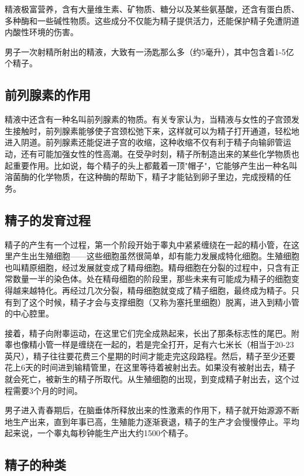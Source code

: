 精液极富营养，含有大量维生素、矿物质、糖分以及某些氨基酸，还含有蛋白质、多种酶和一些碱性物质。这些成分不仅能为精子提供活力，还能保护精子免遭阴道内酸性环境的伤害。

男子一次射精所射出的精液，大致有一汤匙那么多（约5毫升），其中包含着1-5亿个精子。

\subsection{前列腺素的作用}

精液中还含有一种名叫前列腺素的物质。有关专家认为，当精液与女性的子宫颈发生接触时，前列腺素能够使子宫颈松弛下来，这样就可以为精子打开通道，轻松地进入阴道。前列腺素还能促进子宫的收缩，这种收缩不仅有利于精子向输卵管运动，还有可能加强女性的性高潮。在受孕时刻，精子所制造出来的某些化学物质也起重要作用。比如说，每个精子的头上都戴着一顶"帽子"，它能够产生出一种名叫溶菌酶的化学物质，在这种酶的帮助下，精子才能钻到卵子里边，完成授精的任务。

\subsection{精子的发育过程}

精子的产生有一个过程，第一个阶段开始于睾丸中紧紧缠绕在一起的精小管，在这里产生出生殖细胞——这些细胞虽然很简单，却有能力发展成特化细胞。生殖细胞也叫精原细胞，经过发展就变成了精母细胞。精母细胞在分裂的过程中，只含有正常数量一半的染色体。处在精母细胞的阶段里，那些未来有可能成为精子的细胞变得越来越特化。再经过几次分裂，精母细胞就变成了精子细胞，最终成为精子。只有到了这个时候，精子才会与支撑细胞（又称为塞托里细胞）脱离，进入到精小管的中心腔里。

接着，精子向附睾运动，在这里它们完全成熟起来，长出了那条标志性的尾巴。附睾也像精小管一样是缠绕在一起的，若是完全打开，足有六七米长（相当于20-23英尺），精子往往要花费三个星期的时间才能走完这段路程。然后，精子至少还要花上6天的时间进到输精管里，在这里等待着被射出去。如果没有被射出去，精子就会死亡，被新生的精子所取代。从生殖细胞的出现，到变成精子射出去，这个过程需要3个月的时间。

男子进入青春期后，在脑垂体所释放出来的性激素的作用下，精子就开始源源不断地生产出来，直到年事已高，生殖能力逐渐衰退，精子的生产才会慢慢停止。平均起来说，一个睾丸每秒钟能生产出大约1500个精子。

\subsection{精子的种类}

